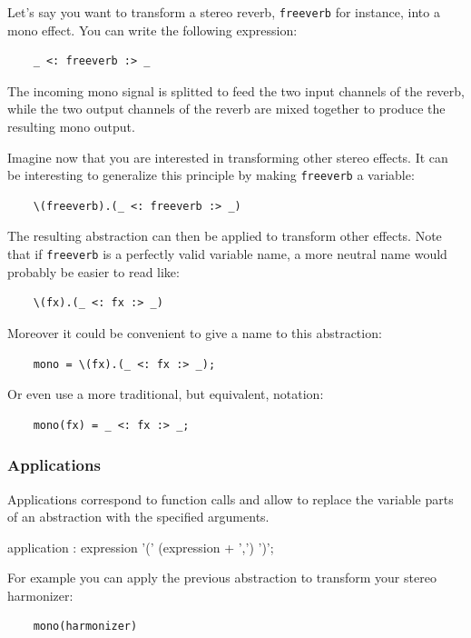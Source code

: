 \documentclass[a4paper,10pt]{book}
\begin{document}
Let's say you want to transform a stereo reverb, \lstinline'freeverb' for instance, into a mono effect. You can write the following expression: 
\begin{lstlisting}
	_ <: freeverb :> _ 
\end{lstlisting}
The incoming mono signal is splitted to feed the two input channels of the reverb, while the two output channels of the reverb are mixed together to produce the resulting mono output.

Imagine now that you are interested in transforming other stereo effects. It can be interesting to generalize this principle by making \lstinline'freeverb' a variable: 
\begin{lstlisting}
	\(freeverb).(_ <: freeverb :> _)
\end{lstlisting}

The resulting abstraction can then be applied to transform other effects. Note that if \lstinline'freeverb' is a perfectly valid variable name, a more neutral name would probably be easier to read like:
\begin{lstlisting}
	\(fx).(_ <: fx :> _)
\end{lstlisting}
 
Moreover it could be convenient to give a name to this abstraction:
\begin{lstlisting}
	mono = \(fx).(_ <: fx :> _);
\end{lstlisting}

Or even use a more traditional, but equivalent, notation:
\begin{lstlisting}
	mono(fx) = _ <: fx :> _;
\end{lstlisting}




\subsubsection{Applications}
Applications correspond to function calls and allow to replace the variable parts of an abstraction with the specified arguments.

\begin{rail}
application : expression '(' (expression + ',') ')';
\end{rail}   

For example you can apply the previous abstraction to transform your stereo harmonizer:
\begin{lstlisting}
	mono(harmonizer)
\end{lstlisting}
\end{document}
